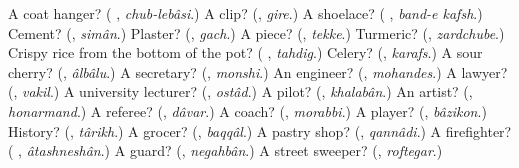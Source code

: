 \begin{tcolorbox}[breakable,colback=teal!4,colframe=teal!35!black,title={Before you move on}]
A coat hanger? (\textbf{ }, \emph{chub-lebâsi}.) A clip? (\textbf{}, \emph{gire}.) A shoelace? (\textbf{ }, \emph{band-e kafsh}.) Cement? (\textbf{}, \emph{simân}.) Plaster? (\textbf{}, \emph{gach}.) A piece? (\textbf{}, \emph{tekke}.) Turmeric? (\textbf{}, \emph{zardchube}.) Crispy rice from the bottom of the pot? (\textbf{ }, \emph{tahdig}.) Celery? (\textbf{}, \emph{karafs}.) A sour cherry? (\textbf{}, \emph{âlbâlu}.) A secretary? (\textbf{}, \emph{monshi}.) An engineer? (\textbf{}, \emph{mohandes}.) A lawyer? (\textbf{}, \emph{vakil}.) A university lecturer? (\textbf{}, \emph{ostâd}.) A pilot? (\textbf{}, \emph{khalabân}.) An artist? (\textbf{}, \emph{honarmand}.) A referee? (\textbf{}, \emph{dâvar}.) A coach? (\textbf{}, \emph{morabbi}.) A player? (\textbf{}, \emph{bâzikon}.) History? (\textbf{}, \emph{târikh}.) A grocer? (\textbf{}, \emph{baqqâl}.) A pastry shop? (\textbf{}, \emph{qannâdi}.) A firefighter? (\textbf{ }, \emph{âtashneshân}.) A guard? (\textbf{}, \emph{negahbân}.) A street sweeper? (\textbf{}, \emph{roftegar}.)
\end{tcolorbox}
